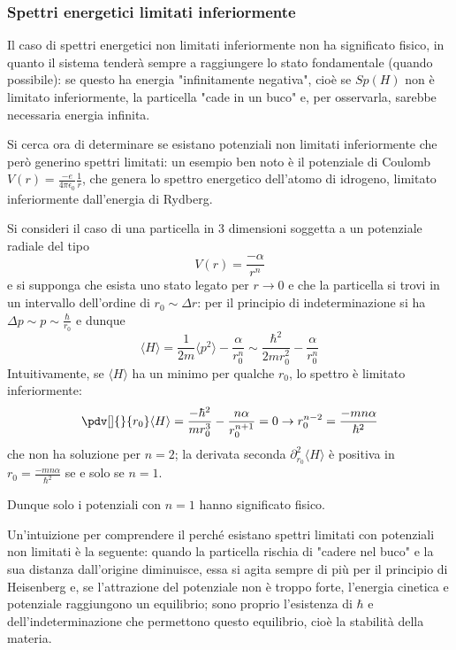 
\subsubsection{Spettri energetici limitati inferiormente}
Il caso di spettri energetici non limitati inferiormente non ha significato fisico, in quanto il sistema
tenderà sempre a raggiungere lo stato fondamentale (quando possibile): se questo ha energia "infinitamente
negativa", cioè se $Sp(H)$ non è limitato inferiormente, la particella "cade in un buco" e, per osservarla,
sarebbe necessaria energia infinita.

Si cerca ora di determinare se esistano potenziali non limitati inferiormente che però generino spettri
limitati: un esempio ben noto è il potenziale di Coulomb $V(r) = \frac{-e}{4\pi\epsilon_0}\frac{1}{r}$, che
genera lo spettro energetico dell'atomo di idrogeno, limitato inferiormente dall'energia di Rydberg.

Si consideri il caso di una particella in 3 dimensioni soggetta a un potenziale radiale del tipo
$$V(r) = \frac{-\alpha}{r^n}$$
e si supponga che esista uno stato legato per $r\to0$ e che la particella si trovi in un intervallo
dell'ordine di $r_0\sim\Delta r$: per il principio di indeterminazione si ha
$\Delta p \sim p \sim \frac{\hbar}{r_0}$ e dunque
$$\langle H \rangle = \frac{1}{2m}\langle p^2\rangle - \frac{\alpha}{r_0^n} \sim 
\frac{\hbar^2}{2mr_0^2} - \frac{\alpha}{r_0^n}$$
Intuitivamente, se $\langle H \rangle$ ha un minimo per qualche $r_0$, lo spettro è limitato inferiormente:
$$\pdv[]{}{r_0}\langle H \rangle = \frac{-\hbar^2}{mr_0^3} - \frac{n\alpha}{r_0^{n+1}} = 0 \to
r_0^{n-2} = \frac{-mn\alpha}{\hbar^2}
$$
che non ha soluzione per $n=2$; la derivata seconda $\partial^2_{r_0} \langle H \rangle$ è positiva in 
$r_0 = \frac{-mn\alpha}{\hbar^2}$ se e solo se $n=1$.

Dunque solo i potenziali con $n=1$ hanno significato fisico.

Un'intuizione per comprendere il perché esistano spettri limitati con potenziali non limitati è la
seguente: quando la particella rischia di "cadere nel buco" e la sua distanza dall'origine diminuisce, essa
si agita sempre di più per il principio di Heisenberg e, se l'attrazione del potenziale non è troppo forte,
l'energia cinetica e potenziale raggiungono un equilibrio; sono proprio l'esistenza di $\hbar$ e
dell'indeterminazione che permettono questo equilibrio, cioè la stabilità della materia.

